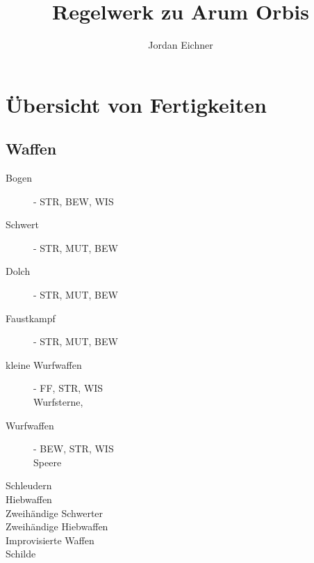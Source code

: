 \documentclass[a4paper,12pt,oneside]{book}
\author{Jordan Eichner}
\title{Regelwerk zu Arum Orbis}
\date{}
\begin{document}
\maketitle
\tableofcontents
\section{Übersicht von Fertigkeiten}
\subsection{Waffen}
\begin{description}
\item[Bogen]- STR, BEW, WIS
\item[Schwert]- STR, MUT, BEW
\item[Dolch]- STR, MUT, BEW
\item[Faustkampf]- STR, MUT, BEW
\item[kleine Wurfwaffen]- FF, STR, WIS
\\Wurfsterne, 
\item[Wurfwaffen]- BEW, STR, WIS
\\Speere
\item[Schleudern]
\item[Hiebwaffen]
\item[Zweihändige Schwerter]
\item[Zweihändige Hiebwaffen]
\item[Improvisierte Waffen]
\item[Schilde]
\end{description}
\end{document}
